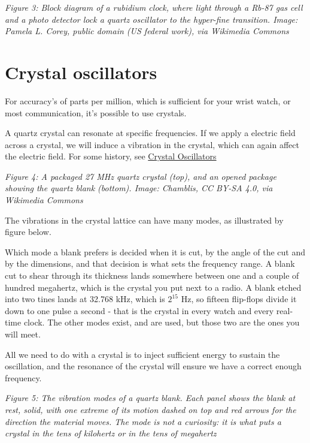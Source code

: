 \emph{Figure 3: Block diagram of a rubidium clock, where light through a
Rb-87 gas cell and a photo detector lock a quartz oscillator to the
hyper-fine transition. Image: Pamela L. Corey, public domain (US federal
work), via Wikimedia Commons}

\section{Crystal oscillators}\label{crystal-oscillators}

For accuracy's of parts per million, which is sufficient for your wrist
watch, or most communication, it's possible to use crystals.

A quartz crystal can resonate at specific frequencies. If we apply a
electric field across a crystal, we will induce a vibration in the
crystal, which can again affect the electric field. For some history,
see \href{https://en.wikipedia.org/wiki/Crystal_oscillator}{Crystal
Oscillators}


{
\centering
{}
}

\emph{Figure 4: A packaged 27 MHz quartz crystal (top), and an opened
package showing the quartz blank (bottom). Image: Chamblis, CC BY-SA
4.0, via Wikimedia Commons}

The vibrations in the crystal lattice can have many modes, as
illustrated by figure below.

Which mode a blank prefers is decided when it is cut, by the angle of
the cut and by the dimensions, and that decision is what sets the
frequency range. A blank cut to shear through its thickness lands
somewhere between one and a couple of hundred megahertz, which is the
crystal you put next to a radio. A blank etched into two tines lands at
32.768 kHz, which is \(2^{15}\) Hz, so fifteen flip-flops divide it down
to one pulse a second - that is the crystal in every watch and every
real-time clock. The other modes exist, and are used, but those two are
the ones you will meet.

All we need to do with a crystal is to inject sufficient energy to
sustain the oscillation, and the resonance of the crystal will ensure we
have a correct enough frequency.


{
\centering
{}
}

\emph{Figure 5: The vibration modes of a quartz blank. Each panel shows
the blank at rest, solid, with one extreme of its motion dashed on top
and red arrows for the direction the material moves. The mode is not a
curiosity: it is what puts a crystal in the tens of kilohertz or in the
tens of megahertz}

